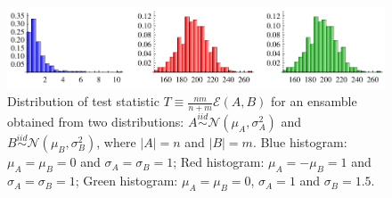 \documentclass[simplex.tex]{subfiles}
\begin{document}
%
\begin{figure}[h!]
\begin{cframed}
\centering
\includegraphics[width=\textwidth]{../../figs/energy_hists.pdf}
\caption{
Distribution of test statistic 
$T\equiv\tfrac{n m }{n+m}\mathcal{E}(A,B)$ 
for an ensamble obtained from two distributions:
$A \stackrel{iid}{\sim} \mathcal{N}(\mu_A,\sigma_A^2)$ and
$B \stackrel{iid}{\sim} \mathcal{N}(\mu_B, \sigma_B^2)$, where
$|A|=n$ and $|B|=m$.
Blue histogram: $\mu_A = \mu_B = 0$ and $\sigma_A = \sigma_B = 1$;
Red histogram: $\mu_A = - \mu_B = 1$ and $\sigma_A = \sigma_B = 1$;
Green histogram: $\mu_A = \mu_B = 0$, $\sigma_A = 1$ and $\sigma_B = 1.5$.
}
\label{fig:nonpar}
\end{cframed}
\end{figure}
%
\clearpage
\end{document}
